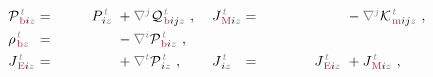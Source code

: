 \begin{subequations}
\begin{align}
	&{\mathcal{P}}^{\;\!\mathcolor{gray}{t}}_{\;\!\textcolor{Maroon}{\text{b}} i \mathcolor{gray}{z}} \hspace{-1em}&&=\hspace{0.2em} ~ \hphantom{+\frac{1}{2!}}~ P^{\;\!\mathcolor{gray}{t}}_{\;\! i\mathcolor{gray}{z}} &&\hspace{-0.7em}+ \mathcolor{gray}{\nabla^j} {\mathcal{Q}}^{\;\!\mathcolor{gray}{t}}_{\;\!\textcolor{Maroon}{\text{b}} ij \mathcolor{gray}{z}}~, &&\hspace{0.3em} {J}^{\;\!\mathcolor{gray}{t}}_{\;\!\textcolor{Maroon}{\text{M}} i \mathcolor{gray}{z}} \hspace{-1em}&&=\hspace{0.2em} &&\hspace{-0.7em}- \mathcolor{gray}{\nabla^j} {\mathcal{K}}^{\;\!\mathcolor{gray}{t}}_{\;\!\textcolor{Maroon}{\text{m}} ij \mathcolor{gray}{z}}~, \label{eq:Pb-Jm-modify} \\
	&{\rho}^{\;\!\mathcolor{gray}{t}}_{\;\!\textcolor{Maroon}{\text{b}} \mathcolor{gray}{z}} \hspace{-1em}&&=\hspace{0.2em} &&\hspace{-0.7em}- \mathcolor{gray}{\nabla^i} {\mathcal{P}}^{\;\!\mathcolor{gray}{t}}_{\;\!\textcolor{Maroon}{\text{b}} i \mathcolor{gray}{z}}~, &&\hspace{0.3em} \hspace{-1em}&&\hspace{0.2em} &&\hspace{-0.7em} \label{eq:pb-Jb-modify} \\
	&{J}^{\;\!\mathcolor{gray}{t}}_{\;\!\textcolor{Maroon}{\text{E}} i \mathcolor{gray}{z}} \hspace{-1em}&&=\hspace{0.2em} &&\hspace{-0.7em}+ \mathcolor{gray}{\nabla^t} {\mathcal{P}}^{\;\!\mathcolor{gray}{t}}_{\;\! i \mathcolor{gray}{z}}~, &&\hspace{0.3em} {J}^{\;\!\mathcolor{gray}{t}}_{\;\! i \mathcolor{gray}{z}} \hspace{-1em}&&=\hspace{0.2em} ~ \hphantom{-\frac{1}{2!} \epsilon^{\hphantom{ij}k}_{i\mathcolor{gray}{j}}} {J}^{\;\!\mathcolor{gray}{t}}_{\;\!\textcolor{Maroon}{\text{E}} i \mathcolor{gray}{z}} &&\hspace{-0.7em}+ {J}^{\;\!\mathcolor{gray}{t}}_{\;\!\textcolor{Maroon}{\text{M}} i \mathcolor{gray}{z}}~, \label{eq:Je-Jb-modify} \\

\end{align}
\end{subequations}
